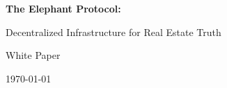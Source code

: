 
\begin{titlepage}
    \centering
    \vspace*{2in}
    
    {\Huge\bfseries The Elephant Protocol:\par}
    \vspace{0.5in}
    {\LARGE Decentralized Infrastructure for Real Estate Truth\par}

    
    \vspace{2in}
    
    {\Large White Paper\par}
    
    \vspace{1in}
    
    {\large\today\par}
    
    \vfill
    
    
\end{titlepage}
